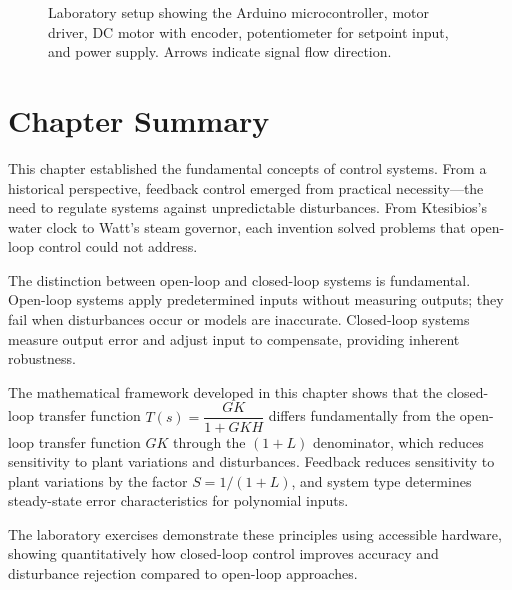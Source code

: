 \begin{figure}[htbp]
\caption{Laboratory setup showing the Arduino microcontroller, motor driver, DC motor with encoder, potentiometer for setpoint input, and power supply. Arrows indicate signal flow direction.}
\label{fig:lab_setup}
\end{figure}

\section{Chapter Summary}
\label{sec:summary}

This chapter established the fundamental concepts of control systems. From a historical perspective, feedback control emerged from practical necessity---the need to regulate systems against unpredictable disturbances. From Ktesibios's water clock to Watt's steam governor, each invention solved problems that open-loop control could not address.

The distinction between open-loop and closed-loop systems is fundamental. Open-loop systems apply predetermined inputs without measuring outputs; they fail when disturbances occur or models are inaccurate. Closed-loop systems measure output error and adjust input to compensate, providing inherent robustness.

The mathematical framework developed in this chapter shows that the closed-loop transfer function $T(s) = \dfrac{GK}{1+GKH}$ differs fundamentally from the open-loop transfer function $GK$ through the $(1+L)$ denominator, which reduces sensitivity to plant variations and disturbances. Feedback reduces sensitivity to plant variations by the factor $S = 1/(1+L)$, and system type determines steady-state error characteristics for polynomial inputs.

The laboratory exercises demonstrate these principles using accessible hardware, showing quantitatively how closed-loop control improves accuracy and disturbance rejection compared to open-loop approaches.

